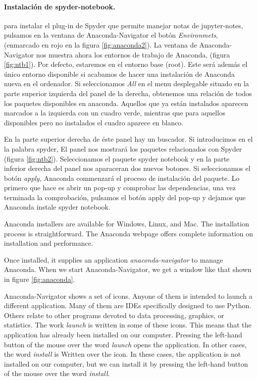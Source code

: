 \begin{paracol}{2}
 \paragraph{Instalación de spyder-notebook.} para instalar el plug-in de Spyder que permite manejar notas de jupyter-notes, pulsamos en la ventana de Anaconda-Navigator el botón \emph{Environmets}, (enmarcado en rojo en la figura \ref{fig:anaconda2}). La ventana de Anaconda-Navigator nos muestra ahora los entornos de trabajo de Anaconda, (figura \ref{fig:ntb1}). Por defecto, estaremos en el entorno base (root). Este será además el único entorno disponible si acabamos de hacer una instalación de Anaconda nueva en el ordenador. Si seleccionamos \emph{All} en el menu desplegable situado en la parte superior izquierda del panel de la derecha,  obtenemos una relación de todos los paquetes disponibles en anaconda. Aquellos que ya están instalados aparecen marcados a la izquierda con un cuadro verde, mientras que para aquellos disponibles pero no instalados el cuadro aparece en blanco.

 En la parte superior derecha de éste panel hay un buscador. Si introducimos en el la palabra spyder, El panel nos mostrará los paquetes relacionados con Spyder (figura \ref{fig:ntb2}). Seleccionamos el paquete spyder notebook y en la parte inferior derecha del panel nos aparaceran dos nuevos botones. Si seleccionamos el botón \emph{apply}, Anaconda commenzará el proceso de instalación del paquete. Lo primero que hace es abrir un pop-up y comprobar las dependencias, una vez terminada la comprobación, pulsamos el botón apply del pop-up y dejamos que Anaconda instale spyder notebook.
 

 \switchcolumn
 Anaconda installers are available for Windows, Linux, and Mac. The installation process is straightforward. The Anaconda webpage offers complete information on installation and performance.

 Once installed, it supplies an application \emph{anaconda-navigator} to manage Anaconda. When we start Anaconda-Navigator, we get a window like that shown in figure \ref{fig:anaconda}.

 Anaconda-Navigator shows a set of icons. Anyone of them is intended to launch a different application. Many of them are IDEs specifically designed to use Python. Others relate to other programs devoted to data processing, graphics, or statistics. The work \emph{launch} is written in some of these icons. This means that the application has already been installed on our computer. Pressing the left-hand button of the mouse over the word \emph{launch} opens the application. In other cases, the word \emph{install} is Written over the icon. In these cases, the application is not installed on our computer, but we can install it by pressing the left-hand button of the mouse over the word \emph{install}.


\end{paracol}
